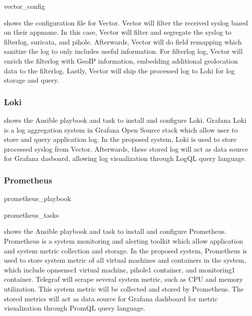 \documentclass[../index.tex]{subfiles}
\begin{document}
{vector_config}

 shows the configuration file for Vector. Vector will filter the received
syslog based on their appname. In this case, Vector will filter and segregate the syslog to
filterlog, suricata, and pihole. Afterwards, Vector will do field remapping which sanitize the log
to only includes useful information. For filterlog log, Vector will enrich the filterlog with GeoIP
information, embedding additional geolocation data to the filterlog. Lastly, Vector will ship the
processed log to Loki for log storage and query.

\subsubsection{Loki}



 shows the Ansible playbook and task to install and configure
Loki. Grafana Loki is a log aggregation system in Grafana Open Source stack which allow user to
store and query application log. In the proposed system, Loki is used to store processed syslog from
Vector. Afterwards, these stored log will act as data source for Grafana dasboard, allowing log
visualization through LogQL query language.

\subsubsection{Prometheus}

{prometheus_playbook}

{prometheus_tasks}

 shows the Ansible playbook and task to install
and configure Prometheus. Prometheus is a system monitoring and alerting toolkit which allow
application and system metric collection and storage. In the proposed system, Prometheus is used to
store system metric of all virtual machines and containers in the system, which include opnsense1
virtual machine, pihole1 container, and monitoring1 container. Telegraf will scrape several system
metric, such as CPU and memory utilization. This system metric  will be collected and stored by
Prometheus. The stored metrics will act as data source for Grafana dashboard for metric
visualization through PromQL query language.
\end{document}

